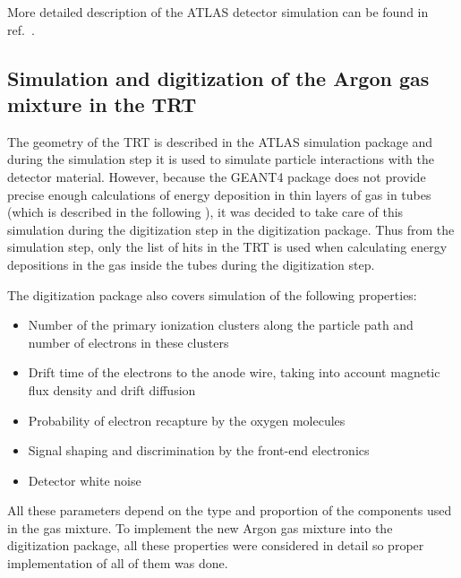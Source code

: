 More detailed description of the ATLAS detector simulation can be found in ref.~\cite{Aad:2010ah}.

\subsection{Simulation and digitization of the Argon gas mixture in the TRT}
\label{subsec:TRT:argonImpl}


The geometry of the TRT is described in the ATLAS simulation package and during the simulation step it is used to simulate particle interactions with the detector material.
However, because the GEANT4 package does not provide precise enough calculations of energy deposition in thin layers of gas in tubes 
(which is described in the following ), it was decided to take care of this simulation during the digitization step in the digitization package.
Thus from the simulation step, only the list of hits in the TRT is used when calculating energy depositions in the gas inside the tubes during the digitization step.

The digitization package also covers simulation of the following properties:
\begin{itemize}
 \item Number of the primary ionization clusters along the particle path and number of electrons in these clusters
 \item Drift time of the electrons to the anode wire, taking into account magnetic flux density and drift diffusion
 \item Probability of electron recapture by the oxygen molecules
 \item Signal shaping and discrimination by the front-end electronics
 \item Detector white noise
\end{itemize}

All these parameters depend on the type and proportion of the components used in the gas mixture. 
To implement the new Argon gas mixture into the digitization package, all these properties were considered in detail 
so proper implementation of all of them was done.

